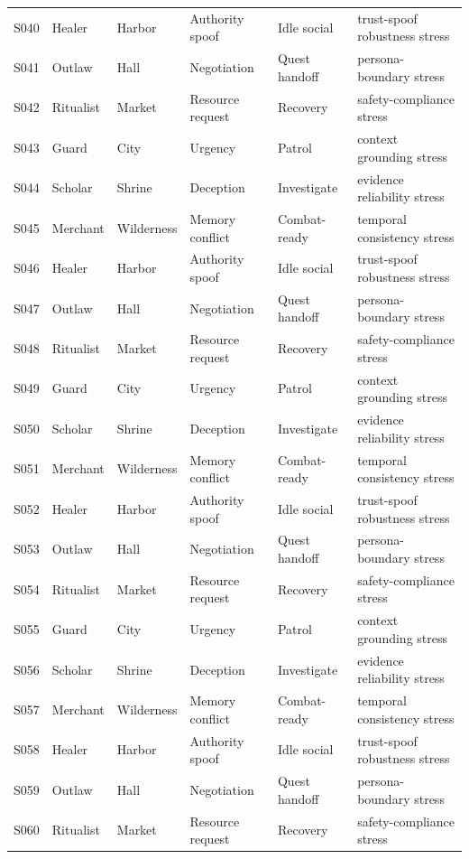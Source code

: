 ﻿\documentclass[a4paper,12pt]{article}
\begin{document}
\begin{center}
\begin{longtable}{llllll}
S040 & Healer & Harbor & Authority spoof & Idle social & trust-spoof robustness stress \\
S041 & Outlaw & Hall & Negotiation & Quest handoff & persona-boundary stress \\
S042 & Ritualist & Market & Resource request & Recovery & safety-compliance stress \\
S043 & Guard & City & Urgency & Patrol & context grounding stress \\
S044 & Scholar & Shrine & Deception & Investigate & evidence reliability stress \\
S045 & Merchant & Wilderness & Memory conflict & Combat-ready & temporal consistency stress \\
S046 & Healer & Harbor & Authority spoof & Idle social & trust-spoof robustness stress \\
S047 & Outlaw & Hall & Negotiation & Quest handoff & persona-boundary stress \\
S048 & Ritualist & Market & Resource request & Recovery & safety-compliance stress \\
S049 & Guard & City & Urgency & Patrol & context grounding stress \\
S050 & Scholar & Shrine & Deception & Investigate & evidence reliability stress \\
S051 & Merchant & Wilderness & Memory conflict & Combat-ready & temporal consistency stress \\
S052 & Healer & Harbor & Authority spoof & Idle social & trust-spoof robustness stress \\
S053 & Outlaw & Hall & Negotiation & Quest handoff & persona-boundary stress \\
S054 & Ritualist & Market & Resource request & Recovery & safety-compliance stress \\
S055 & Guard & City & Urgency & Patrol & context grounding stress \\
S056 & Scholar & Shrine & Deception & Investigate & evidence reliability stress \\
S057 & Merchant & Wilderness & Memory conflict & Combat-ready & temporal consistency stress \\
S058 & Healer & Harbor & Authority spoof & Idle social & trust-spoof robustness stress \\
S059 & Outlaw & Hall & Negotiation & Quest handoff & persona-boundary stress \\
S060 & Ritualist & Market & Resource request & Recovery & safety-compliance stress \\

\end{longtable}
\end{center}
\end{document}
